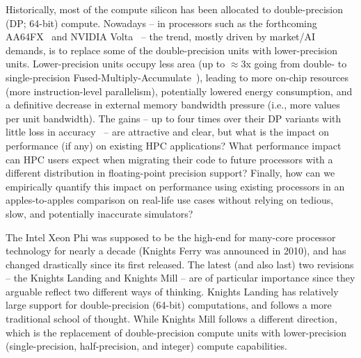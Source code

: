 Historically, most of the compute silicon has been allocated to double-precision (DP; 64-bit) compute.
Nowadays -- in processors such as the forthcoming AA64FX~\cite{yoshida_fujitsu_2018} and NVIDIA
Volta~\cite{choquette_volta:_2018} -- the trend, mostly driven by market/AI demands, is to replace
some of the double-precision units with lower-precision units.
Lower-precision units occupy less area (up to $\approx$3x going from double- to single-precision
Fused-Multiply-Accumulate~\cite{pu_fpmax:_2016}), leading to more on-chip resources (more
instruction-level parallelism), potentially lowered energy consumption, and a definitive
decrease in external memory bandwidth pressure (i.e., more values per unit bandwidth).
The gains -- up to four times over their DP variants with little loss in
accuracy~\cite{haidar_harnessing_2018} -- are attractive and clear, but what is the impact on
performance (if any) on existing HPC applications? What performance impact can HPC users expect when migrating their code to future processors with a different distribution
in floating-point precision support? Finally, how can we empirically quantify this impact on
performance using existing processors in an apples-to-apples comparison on real-life use cases
without relying on tedious, slow, and potentially inaccurate simulators? %

The Intel Xeon Phi was supposed to be the high-end for many-core processor technology for nearly
a decade (Knights Ferry was announced in 2010), and has changed drastically since its first released.
The latest (and also last) two revisions -- the Knights Landing and Knights Mill -- are of
particular importance since they arguable reflect two different ways of thinking. Knights Landing
has relatively large support for double-precision (64-bit) computations, and follows a
more traditional school of thought. While Knights Mill follows a different direction, which is the replacement
of double-precision compute units with lower-precision (single-precision, half-precision, and integer)
compute capabilities.

